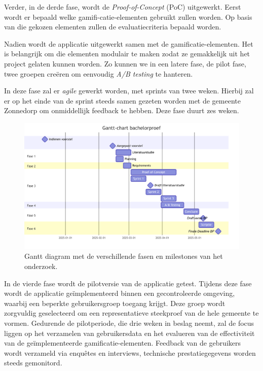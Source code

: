 \documentclass{hogent-article}
\begin{document}
Verder, in de derde fase,  wordt de \emph{Proof-of-Concept} (PoC) uitgewerkt. Eerst wordt er bepaald welke gamifi-catie-elementen gebruikt zullen worden. Op basis van die gekozen elementen zullen de evaluatiecriteria bepaald worden.

Nadien wordt de applicatie uitgewerkt samen met de gamificatie-elementen. Het is belangrijk om die elementen modulair te maken zodat ze gemakkelijk uit het project gelaten kunnen worden. Zo kunnen we in een latere fase, de pilot fase, twee groepen creëren om eenvoudig \emph{A/B testing} te hanteren.

In deze fase zal er \emph{agile} gewerkt worden, met sprints van twee weken. Hierbij zal er op het einde van de sprint steeds samen gezeten worden met de gemeente Zonnedorp om onmiddellijk feedback te hebben. Deze fase duurt zes weken. 

\begin{figure}
    \centering
    \includegraphics[width=\textwidth]{chart.png}
    \caption{\label{fig:gantt}Gantt diagram met de verschillende fasen en milestones van het onderzoek.}
\end{figure}

In de vierde fase wordt de pilotversie van de applicatie getest. Tijdens deze fase wordt de applicatie geïmplementeerd binnen een gecontroleerde omgeving, waarbij een beperkte gebruikersgroep toegang krijgt. Deze groep wordt zorgvuldig geselecteerd om een representatieve steekproef van de hele gemeente te vormen. Gedurende de pilotperiode, die drie weken in beslag neemt, zal de focus liggen op het verzamelen van gebruikersdata en het evalueren van de effectiviteit van de geïmplementeerde gamificatie-elementen. Feedback van de gebruikers wordt verzameld via enquêtes en interviews, technische prestatiegegevens worden steeds gemonitord. 
\end{document}
